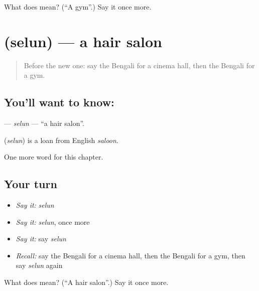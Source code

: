 \begin{tcolorbox}[breakable,colback=teal!4,colframe=teal!35!black,title={Before you move on}]
What does  mean? (\textquotedblleft{}A gym\textquotedblright{}.) Say it once more.
\end{tcolorbox}
\section[\texorpdfstring{\bn{সেলুন} (selun)}{সেলুন (selun)}]{ (selun) — a hair salon}

\label{lesson:BN-C245-selun}



\begin{quote}
Before the new one: say the Bengali for a cinema hall, then the Bengali for a gym.
\end{quote}

\subsection*{You'll want to know: }
\textbf{} — \emph{selun} — \textquotedblleft{}a hair salon\textquotedblright{}.

\begin{cousinweb}
\textbf{} (\emph{selun}) is a loan from English \emph{saloon}.
\end{cousinweb}

\begin{grammarlens}[title={What you've built}]
One more word for this chapter.
\end{grammarlens}

\subsection*{Your turn}
\begin{itemize}
\raggedright
  \item \emph{Say it:} \emph{selun}
  \item \emph{Say it:} \emph{selun}, once more
  \item \emph{Say it:} say \emph{selun}
  \item \emph{Recall:} say the Bengali for a cinema hall, then the Bengali for a gym, then say \emph{selun} again
\end{itemize}

\begin{tcolorbox}[breakable,colback=teal!4,colframe=teal!35!black,title={Before you move on}]
What does  mean? (\textquotedblleft{}A hair salon\textquotedblright{}.) Say it once more.
\end{tcolorbox}
